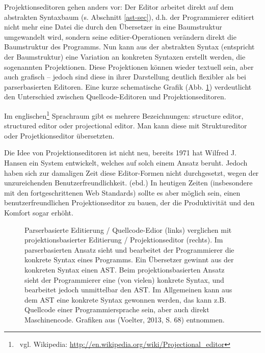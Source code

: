  
Projektionseditoren gehen anders vor: Der Editor arbeitet direkt auf dem abstrakten Syntaxbaum (s. Abschnitt \ref{ast-sec}), d.h. der Programmierer editiert nicht mehr eine Datei die durch den Übersetzer in eine Baumstruktur umgewandelt wird, sondern seine editier-Operationen verändern direkt die Baumstruktur des Programms. \citep[S.~68]{Voelter} Nun kann aus der abstrakten Syntax (entspricht der Baumstruktur) eine Variation an konkreten Syntaxen erstellt werden, die sogenannten Projektionen. Diese Projektionen können wieder textuell sein, aber auch grafisch -- jedoch sind diese in ihrer Darstellung deutlich flexibler als bei parserbasierten Editoren. Eine kurze schematische Grafik (Abb. \ref{parserprojectional}) verdeutlicht den Unterschied zwischen Quellcode-Editoren und Projektionseditoren.

 
Im englischen\footnote{~vgl. Wikipedia: \url{http://en.wikipedia.org/wiki/Projectional\_editor}} Sprachraum gibt es mehrere Bezeichnungen: structure editor, structured editor oder projectional editor. Man kann diese mit Struktureditor oder Projetkionseditor übersetzten.

 
Die Idee von Projektionseditoren ist nicht neu, bereits 1971 hat Wilfred J. Hansen ein System entwickelt, welches auf solch einem Ansatz beruht. \citep[S.~91]{Gomolka} Jedoch haben sich zur damaligen Zeit diese Editor-Formen nicht durchgesetzt, wegen der unzureichenden Benutzerfreundlichkeit. (ebd.) In heutigen Zeiten (insbesondere mit den fortgeschrittenen Web Standards) sollte es aber möglich sein, einen benutzerfreundlichen Projektionseditor zu bauen, der die Produktivität und den Komfort sogar erhöht.

 
\begin{figure}[h!]
\centering
\advance\leftskip-2.5cm
\caption[Parserbasierte versus projektionsbasierte Editierung]{ Parserbasierte Editierung / Quellcode-Edior (links) verglichen mit projektionsbasierter Editierung / Projektionseditor (rechts). Im parserbasierten Ansatz sieht und bearbeitet der Programmierer die konkrete Syntax eines Programms. Ein Übersetzer gewinnt aus der konkreten Syntax einen AST. Beim projektionsbasierten Ansatz sieht der Programmierer eine (von vielen) konkrete Syntax, und bearbeitet jedoch unmittelbar den AST. Im Allgemeinen kann aus dem AST eine konkrete Syntax gewonnen werden, das kann z.B. Quellcode einer Programmiersprache sein, aber auch direkt Maschinencode. Grafiken aus (Voelter, 2013, S. 68) entnommen. }\label{parserprojectional}
\end{figure}
 
